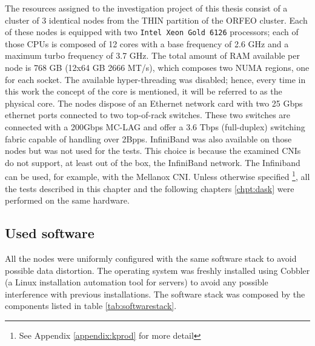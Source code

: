 The resources assigned to the investigation project of this thesis consist of a
cluster of 3 identical nodes from the THIN partition of the ORFEO cluster. Each
of these nodes is equipped with two \texttt{Intel Xeon Gold 6126} processors;
each of those CPUs is composed of 12 cores with a base frequency of 2.6 GHz and
a maximum turbo frequency of 3.7 GHz. The total amount of RAM available per node
is 768 GB (12x64 GB 2666 MT/s), which composes two NUMA regions, one for each
socket. The available hyper-threading was disabled; hence, every time in this
work the concept of the core is mentioned, it will be referred to as the
physical core. The nodes dispose of an Ethernet network card with two 25 Gbps
ethernet ports connected to two top-of-rack switches. These two switches are
connected with a  200Gbps MC-LAG and offer a 3.6 Tbps (full-duplex) switching
fabric capable of handling over 2Bpps. InfiniBand was also available on those
nodes but was not used for the tests. This choice is because the examined CNIs
do not support, at least out of the box, the InfiniBand network. The Infiniband
can be used, for example, with the Mellanox CNI. Unless otherwise specified
\footnote{See Appendix \ref{appendix:kprod} for more detail}, all the tests
described in this chapter and the following chapters \ref{chpt:dask} were
performed on the same hardware. 

\subsection{Used software}

All the nodes were uniformly configured with the same software stack to avoid
possible data distortion. The operating system was freshly installed using
Cobbler (a Linux installation automation tool for servers) to avoid any possible
interference with previous installations.
The software stack was composed by the components listed in table
\ref{tab:softwarestack}.

